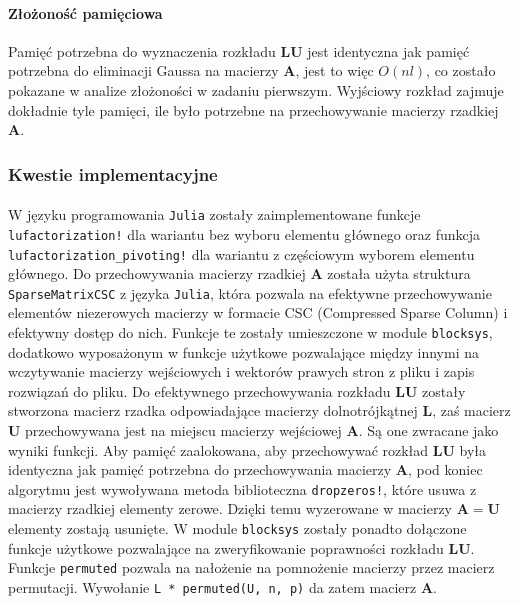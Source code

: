 \documentclass[a4paper]{article}
\begin{document}
\paragraph{Złożoność pamięciowa}
Pamięć potrzebna do wyznaczenia rozkładu $\mathbf{LU}$ jest identyczna jak pamięć potrzebna do eliminacji Gaussa na macierzy $\mathbf{A}$, jest to więc $O(nl)$, co zostało pokazane w analize złożoności w zadaniu pierwszym. Wyjściowy rozkład zajmuje dokładnie tyle pamięci, ile było potrzebne na przechowywanie macierzy rzadkiej $\mathbf{A}$.

\subsubsection{Kwestie implementacyjne}
\paragraph{}
W języku programowania \texttt{Julia} zostały zaimplementowane funkcje \texttt{lufactorization!} dla wariantu bez wyboru elementu głównego oraz funkcja \texttt{lufactorization\_pivoting!} dla wariantu z częściowym wyborem elementu głównego. Do przechowywania macierzy rzadkiej $\mathbf{A}$ została użyta struktura \texttt{SparseMatrixCSC} z języka \texttt{Julia}, która pozwala na efektywne przechowywanie elementów niezerowych macierzy w formacie CSC (Compressed Sparse Column) i efektywny dostęp do nich. Funkcje te zostały umieszczone w module \texttt{blocksys}, dodatkowo wyposażonym w funkcje użytkowe pozwalające między innymi na wczytywanie macierzy wejściowych i wektorów prawych stron z pliku i zapis rozwiązań do pliku. Do efektywnego przechowywania rozkładu $\mathbf{LU}$ zostały stworzona macierz rzadka odpowiadające macierzy dolnotrójkątnej $\mathbf{L}$, zaś macierz $\mathbf{U}$ przechowywana jest na miejscu macierzy wejściowej $\mathbf{A}$. Są one zwracane jako wyniki funkcji. Aby pamięć zaalokowana, aby przechowywać rozkład $\mathbf{LU}$ była identyczna jak pamięć potrzebna do przechowywania macierzy $\mathbf{A}$, pod koniec algorytmu jest wywoływana metoda biblioteczna \texttt{dropzeros!}, które usuwa z macierzy rzadkiej elementy zerowe. Dzięki temu wyzerowane w macierzy $\mathbf{A = U}$ elementy zostają usunięte. W module \texttt{blocksys} zostały ponadto dołączone funkcje użytkowe pozwalające na zweryfikowanie poprawności rozkładu $\mathbf{LU}$. Funkcje \texttt{permuted} pozwala na nałożenie na pomnożenie macierzy przez macierz permutacji. Wywołanie \texttt{L * permuted(U, n, p)} da zatem macierz $\mathbf{A}$.
\end{document}
